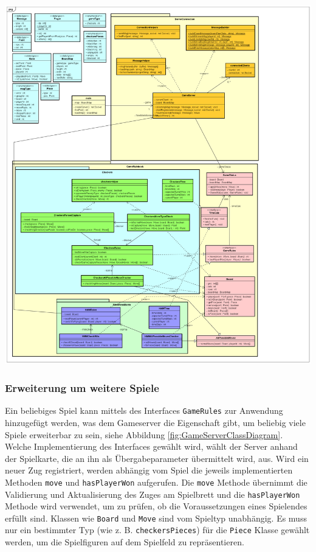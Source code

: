 \documentclass[12pt,a4paper,bibliography=totocnumbered,listof=totocnumbered]{article}
\begin{document}
\vspace{1em}
\begin{minipage}{\linewidth}
	\centering
	\includegraphics[width=1.0\linewidth]{pics/GameServerClassDiagram.png}
	\label{fig:GameServerClassDiagram}
\end{minipage}

\subsubsection{Erweiterung um weitere Spiele}
Ein beliebiges Spiel kann mittels des Interfaces \texttt{GameRules} zur Anwendung hinzugefügt werden, was dem Gameserver die Eigenschaft gibt, um 
beliebig viele Spiele erweiterbar zu sein, siehe Abbildung \ref{fig:GameServerClassDiagram}. Welche Implementierung des Interfaces gewählt wird, 
wählt der Server anhand der Spielkarte, die an ihn
als Übergabeparameter übermittelt wird, aus. Wird ein neuer Zug registriert, werden abhängig vom Spiel die jeweils implementierten Methoden 
\texttt{move} und \texttt{hasPlayerWon} aufgerufen.
Die \texttt{move} Methode übernimmt die Validierung und Aktualisierung des Zuges am Spielbrett und
die \texttt{hasPlayerWon} Methode wird verwendet, um zu prüfen, ob die Voraussetzungen eines Spielendes erfüllt sind.
Klassen wie \texttt{Board} und \texttt{Move} sind vom Spieltyp unabhängig. Es muss nur ein bestimmter Typ (wie z. B. \texttt{checkersPieces}) für die \texttt{Piece} 
Klasse gewählt werden, um die Spielfiguren auf dem Spielfeld zu repräsentieren.  
\end{document}
